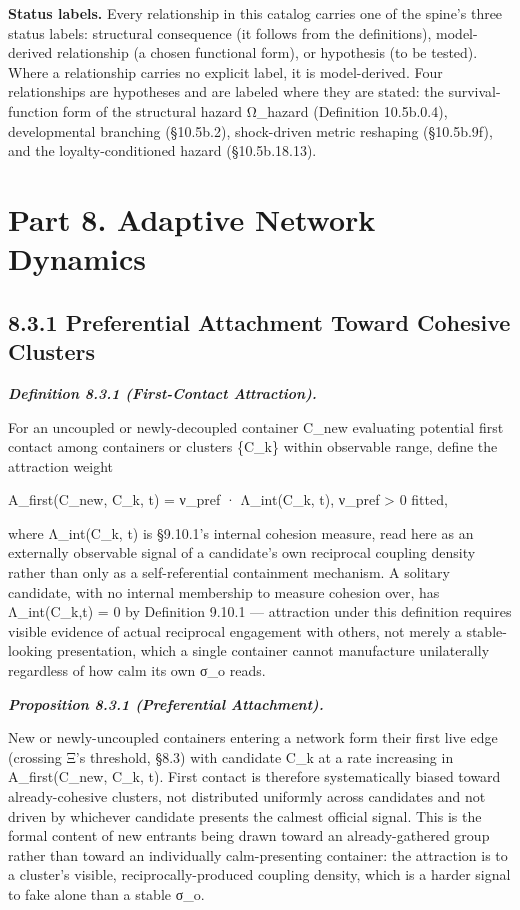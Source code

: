 \documentclass[
]{article}
\begin{document}
\textbf{Status labels.} Every relationship in this catalog carries one
of the spine's three status labels: structural consequence (it follows
from the definitions), model-derived relationship (a chosen functional
form), or hypothesis (to be tested). Where a relationship carries no
explicit label, it is model-derived. Four relationships are hypotheses
and are labeled where they are stated: the survival-function form of the
structural hazard Ω\_hazard (Definition 10.5b.0.4), developmental
branching (§10.5b.2), shock-driven metric reshaping (§10.5b.9f), and the
loyalty-conditioned hazard (§10.5b.18.13).

\hypertarget{part-8.-adaptive-network-dynamics}{%
\section{Part 8. Adaptive Network
Dynamics}\label{part-8.-adaptive-network-dynamics}}

\hypertarget{preferential-attachment-toward-cohesive-clusters}{%
\subsection{8.3.1 Preferential Attachment Toward Cohesive
Clusters}\label{preferential-attachment-toward-cohesive-clusters}}

\emph{\textbf{Definition 8.3.1 (First-Contact Attraction).}}

For an uncoupled or newly-decoupled container C\_new evaluating
potential first contact among containers or clusters \{C\_k\} within
observable range, define the attraction weight

A\_first(C\_new, C\_k, t) = ν\_pref · Λ\_int(C\_k, t), ν\_pref
\textgreater{} 0 fitted,

where Λ\_int(C\_k, t) is §9.10.1's internal cohesion measure, read here
as an externally observable signal of a candidate's own reciprocal
coupling density rather than only as a self-referential containment
mechanism. A solitary candidate, with no internal membership to measure
cohesion over, has Λ\_int(C\_k,t) = 0 by Definition 9.10.1 ---
attraction under this definition requires visible evidence of actual
reciprocal engagement with others, not merely a stable-looking
presentation, which a single container cannot manufacture unilaterally
regardless of how calm its own σ\_o reads.

\emph{\textbf{Proposition 8.3.1 (Preferential Attachment).}}

New or newly-uncoupled containers entering a network form their first
live edge (crossing Ξ's threshold, §8.3) with candidate C\_k at a rate
increasing in A\_first(C\_new, C\_k, t). First contact is therefore
systematically biased toward already-cohesive clusters, not distributed
uniformly across candidates and not driven by whichever candidate
presents the calmest official signal. This is the formal content of new
entrants being drawn toward an already-gathered group rather than toward
an individually calm-presenting container: the attraction is to a
cluster's visible, reciprocally-produced coupling density, which is a
harder signal to fake alone than a stable σ\_o.
\end{document}

